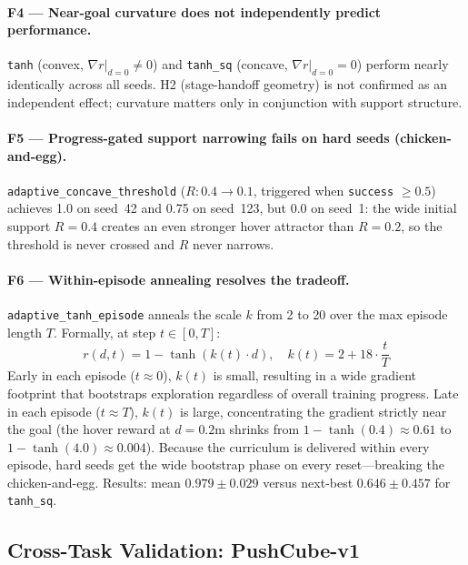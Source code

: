 \documentclass{article}
\begin{document}
\paragraph{F4 — Near-goal curvature does not independently predict performance.}
\texttt{tanh} (convex, $\nabla r|_{d=0} \neq 0$) and \texttt{tanh\_sq}
(concave, $\nabla r|_{d=0} = 0$) perform nearly identically across all seeds.
H2 (stage-handoff geometry) is not confirmed as an independent effect;
curvature matters only in conjunction with support structure.

\paragraph{F5 — Progress-gated support narrowing fails on hard seeds (chicken-and-egg).}
\texttt{adaptive\_concave\_threshold} ($R: 0.4 \to 0.1$, triggered when
\texttt{success} $\geq 0.5$) achieves 1.0 on seed~42 and 0.75 on seed~123,
but 0.0 on seed~1: the wide initial support $R{=}0.4$ creates an even stronger
hover attractor than $R{=}0.2$, so the threshold is never crossed and $R$ never
narrows.

\paragraph{F6 — Within-episode annealing resolves the tradeoff.}
\texttt{adaptive\_tanh\_episode} anneals the scale $k$ from 2 to 20 over the max episode length $T$. Formally, at step $t \in [0, T]$:
\begin{equation}
    r(d, t) = 1 - \tanh(k(t) \cdot d), \quad k(t) = 2 + 18 \cdot \frac{t}{T}
\end{equation}
Early in each episode ($t \approx 0$), $k(t)$ is small, resulting in a wide gradient footprint that bootstraps exploration regardless of overall training progress.
Late in each episode ($t \approx T$), $k(t)$ is large, concentrating the gradient strictly near the goal (the hover reward at $d=0.2$m shrinks from $1-\tanh(0.4) \approx 0.61$ to $1-\tanh(4.0) \approx 0.004$).
Because the curriculum is delivered within every episode, hard seeds get the wide
bootstrap phase on every reset---breaking the chicken-and-egg.
Results: mean $0.979 \pm 0.029$ versus next-best $0.646 \pm 0.457$ for \texttt{tanh\_sq}.

\subsection{Cross-Task Validation: PushCube-v1}
\label{sec:pushcube}
\end{document}
